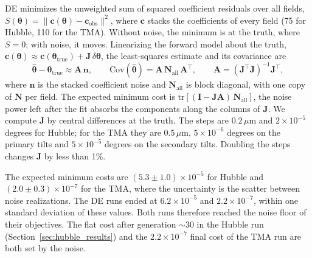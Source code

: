 DE minimizes the unweighted sum of squared coefficient residuals over all fields, $S(\boldsymbol{\theta}) = \lVert\mathbf{c}(\boldsymbol{\theta}) - \mathbf{c}_{\mathrm{obs}}\rVert^2$, where $\mathbf{c}$ stacks the coefficients of every field (75 for Hubble, 110 for the TMA). Without noise, the minimum is at the truth, where $S=0$; with noise, it moves. Linearizing the forward model about the truth, $\mathbf{c}(\boldsymbol{\theta})\approx\mathbf{c}(\boldsymbol{\theta}_{\mathrm{true}}) + \mathbf{J}\,\delta\boldsymbol{\theta}$, the least-squares estimate and its covariance are
\begin{equation}
\hat{\boldsymbol{\theta}} - \boldsymbol{\theta}_{\mathrm{true}} \approx \mathbf{A}\,\mathbf{n},\qquad
\mathrm{Cov}(\hat{\boldsymbol{\theta}}) = \mathbf{A}\,\mathbf{N}_{\mathrm{all}}\,\mathbf{A}^{\top},\qquad
\mathbf{A} = (\mathbf{J}^{\top}\mathbf{J})^{-1}\mathbf{J}^{\top},
\label{eq:lscov}
\end{equation}
where $\mathbf{n}$ is the stacked coefficient noise and $\mathbf{N}_{\mathrm{all}}$ is block diagonal, with one copy of $\mathbf{N}$ per field. The expected minimum cost is $\mathrm{tr}[(\mathbf{I}-\mathbf{J}\mathbf{A})\,\mathbf{N}_{\mathrm{all}}]$, the noise power left after the fit absorbs the components along the columns of $\mathbf{J}$. We compute $\mathbf{J}$ by central differences at the truth. The steps are $0.2\,\mu\mathrm{m}$ and $2\times10^{-5}$ degrees for Hubble; for the TMA they are $0.5\,\mu\mathrm{m}$, $5\times10^{-6}$ degrees on the primary tilts and $5\times10^{-5}$ degrees on the secondary tilts. Doubling the steps changes $\mathbf{J}$ by less than 1\%.

The expected minimum costs are $(5.3\pm1.0)\times10^{-5}$ for Hubble and $(2.0\pm0.3)\times10^{-7}$ for the TMA, where the uncertainty is the scatter between noise realizations. The DE runs ended at $6.2\times10^{-5}$ and $2.2\times10^{-7}$, within one standard deviation of these values. Both runs therefore reached the noise floor of their objectives. The flat cost after generation $\sim30$ in the Hubble run (Section~\ref{sec:hubble_results}) and the $2.2\times10^{-7}$ final cost of the TMA run are both set by the noise.

